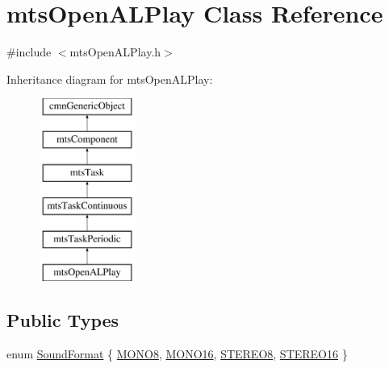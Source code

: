 \hypertarget{classmts_open_a_l_play}{}\section{mts\+Open\+A\+L\+Play Class Reference}
\label{classmts_open_a_l_play}


{\ttfamily \#include $<$mts\+Open\+A\+L\+Play.\+h$>$}

Inheritance diagram for mts\+Open\+A\+L\+Play\+:\begin{figure}[H]
\begin{center}
\leavevmode
\includegraphics[height=6.000000cm]{d7/ddc/classmts_open_a_l_play}
\end{center}
\end{figure}
\subsection*{Public Types}
\begin{DoxyCompactItemize}
\item 
enum \hyperlink{classmts_open_a_l_play_a88d698e1caaf2a80b4eb8e50fdc45b8f}{Sound\+Format} \{ \hyperlink{classmts_open_a_l_play_a88d698e1caaf2a80b4eb8e50fdc45b8fa64a9772c3cf057b08068fe6c20a01660}{M\+O\+N\+O8}, 
\hyperlink{classmts_open_a_l_play_a88d698e1caaf2a80b4eb8e50fdc45b8faa2682e9a5aaff73a15e87702ecfc5ba4}{M\+O\+N\+O16}, 
\hyperlink{classmts_open_a_l_play_a88d698e1caaf2a80b4eb8e50fdc45b8fab307998f8248e825c4fbb43a023bace6}{S\+T\+E\+R\+E\+O8}, 
\hyperlink{classmts_open_a_l_play_a88d698e1caaf2a80b4eb8e50fdc45b8fa926c76550b48a2b3acd9401e0b872872}{S\+T\+E\+R\+E\+O16}
 \}
\end{DoxyCompactItemize}
